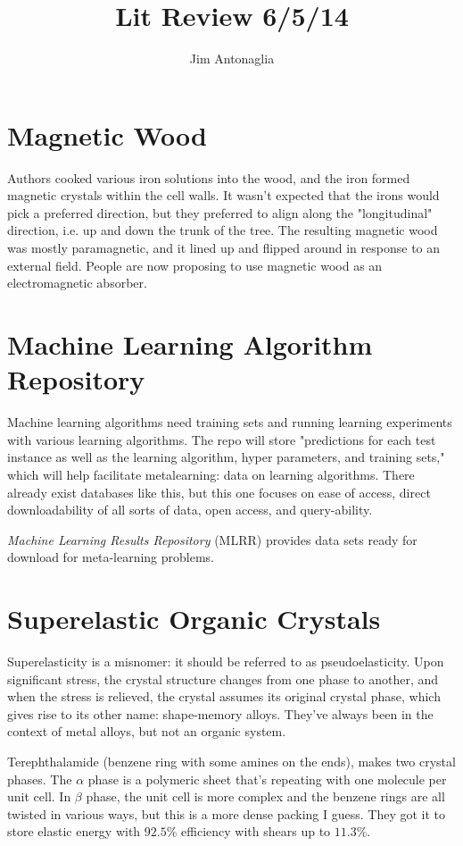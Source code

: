 \documentclass[11pt]{amsart}
\title{Lit Review 6/5/14}
\author{Jim Antonaglia}
\date{}                                           %
\begin{document}
\maketitle
\section{Magnetic Wood}
Authors cooked various iron solutions into the wood, and the iron formed magnetic crystals within the cell walls. It wasn't expected that the irons would pick a preferred direction, but they preferred to align along the "longitudinal" direction, i.e. up and down the trunk of the tree. The resulting magnetic wood was mostly paramagnetic, and it lined up and flipped around in response to an external field. People are now proposing to use magnetic wood as an electromagnetic absorber.

\section{Machine Learning Algorithm Repository}
Machine learning algorithms need training sets and running learning experiments with various learning algorithms. The repo will store "predictions for each test instance as well as the learning algorithm, hyper parameters, and training sets," which will help facilitate metalearning: data on learning algorithms. There already exist databases like this, but this one focuses on ease of access, direct downloadability of all sorts of data, open access, and query-ability.

\emph{Machine Learning Results Repository} (MLRR) provides data sets ready for download for meta-learning problems.

\section{Superelastic Organic Crystals}
Superelasticity is a misnomer: it should be referred to as pseudoelasticity. Upon significant stress, the crystal structure changes from one phase to another, and when the stress is relieved, the crystal assumes its original crystal phase, which gives rise to its other name: shape-memory alloys. They've always been in the context of metal alloys, but not an organic system.

Terephthalamide (benzene ring with some amines on the ends), makes two crystal phases. The $\alpha$ phase is a polymeric sheet that's repeating with one molecule per unit cell. In $\beta$ phase, the unit cell is more complex and the benzene rings are all twisted in various ways, but this is a more dense packing I guess. They got it to store elastic energy with $92.5\%$ efficiency with shears up to $11.3\%$.
\end{document}
